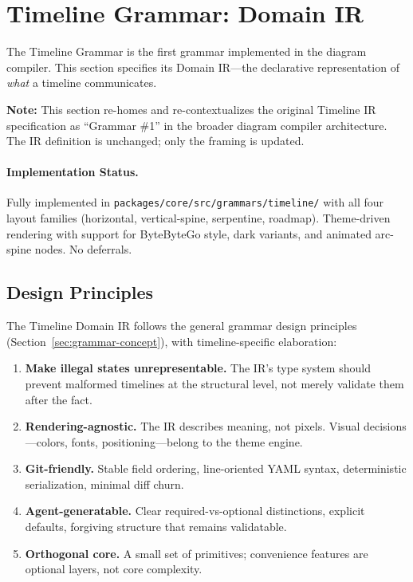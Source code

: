 \section{Timeline Grammar: Domain IR}
\label{sec:timeline-grammar}

The Timeline Grammar is the first grammar implemented in the diagram compiler. This section specifies its Domain IR---the declarative representation of \emph{what} a timeline communicates.

\textbf{Note:} This section re-homes and re-contextualizes the original Timeline IR specification as ``Grammar \#1'' in the broader diagram compiler architecture. The IR definition is unchanged; only the framing is updated.

\paragraph{Implementation Status.}
Fully implemented in \texttt{packages/core/src/grammars/timeline/} with all four layout families (horizontal, vertical-spine, serpentine, roadmap). Theme-driven rendering with support for ByteByteGo style, dark variants, and animated arc-spine nodes. No deferrals.

\subsection{Design Principles}

The Timeline Domain IR follows the general grammar design principles (Section~\ref{sec:grammar-concept}), with timeline-specific elaboration:

\begin{enumerate}
  \item \textbf{Make illegal states unrepresentable.} The IR's type system should prevent
        malformed timelines at the structural level, not merely validate them after the fact.
  \item \textbf{Rendering-agnostic.} The IR describes meaning, not pixels. Visual
        decisions---colors, fonts, positioning---belong to the theme engine.
  \item \textbf{Git-friendly.} Stable field ordering, line-oriented YAML syntax, deterministic
        serialization, minimal diff churn.
  \item \textbf{Agent-generatable.} Clear required-vs-optional distinctions, explicit defaults,
        forgiving structure that remains validatable.
  \item \textbf{Orthogonal core.} A small set of primitives; convenience features are optional
        layers, not core complexity.
\end{enumerate}


